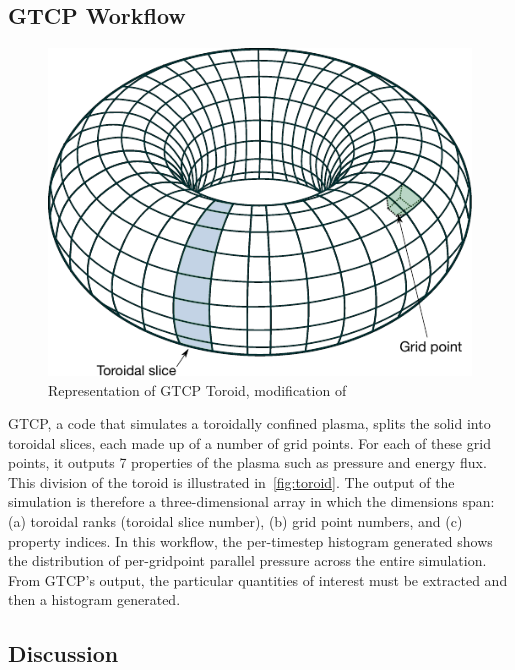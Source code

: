 \documentclass[conference]{IEEEtran}
\begin{document}
\subsection{GTCP Workflow}

\begin{figure}
  \centering
  \vspace{-0.10in}
  \includegraphics[width=0.7\columnwidth]{fig/Simple_Torus_mod}
  \vspace{-0.09in}
  \caption{Representation of GTCP Toroid, modification of \cite{WikimediaCommons:torus}}
  \label{fig:toroid}
  \vspace{-0.20in}
\end{figure}

GTCP, a code that simulates a toroidally confined plasma, splits the solid into
toroidal slices, each made up of a number of grid points. For each of these
grid points, it outputs 7 properties of the plasma such as pressure and energy
flux. This division of the toroid is illustrated in~\autoref{fig:toroid}.
The output of the simulation is therefore a three-dimensional array in which
the dimensions span: (a) toroidal ranks (toroidal slice number), (b) grid point
numbers, and (c) property indices. In this workflow, the per-timestep histogram
generated shows the distribution of per-gridpoint parallel pressure across
the entire simulation. From GTCP's output, the particular quantities of
interest must be extracted and then a histogram generated.

\subsection{Discussion}
\end{document}
